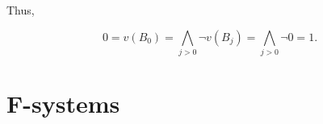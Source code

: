 \documentclass[12pt]{article}
\theoremstyle{remark}
\begin{document}
Thus, 

\[0 = v(B_0) = \bigwedge_{j > 0} \neg v(B_j)= \bigwedge_{j > 0} \neg 0 = 1.\]


\appendix


\section{F-systems}
\label{app}




\end{document}
